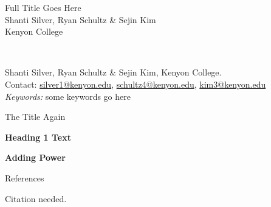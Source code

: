 \documentclass[a4paper,12pt]{report}
\begin{document}
	\thispagestyle{plain}
	\begin{center}
		\vspace*{150pt}
		Full Title Goes Here \\
		Shanti Silver, Ryan Schultz \& Sejin Kim \\
		Kenyon College \\
	\end{center}
	\vspace*{120pt}
	 \\
	\begin{raggedright}
		Shanti Silver, Ryan Schultz \& Sejin Kim, Kenyon College. \\
		Contact: \href{mailto:silver1@kenyon.edu}{silver1@kenyon.edu}, \href{mailto:schultz4@kenyon.edu}{schultz4@kenyon.edu}, \href{mailto:kim3@kenyon.edu}{kim3@kenyon.edu} \\
		\vspace*{40pt}
		\textit{Keywords:} some keywords go here
	\end{raggedright}
	
	\newpage

	\begin{center}
		The Title Again
	\end{center}
	\begin{center}
		\textbf{Heading 1 Text}
	\end{center}
	\justify
	\lipsum[10-13]
	\begin{center}
		\textbf{Adding Power}
	\end{center}
	\justify
	\lipsum[14-17]
	
	\newpage
	
	\begin{center}
		References
	\end{center}
	\raggedright
	\begin{hangparas}{.5in}{1}
		Citation needed.
	\end{hangparas}
\end{document}
